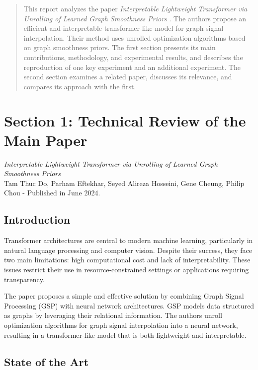 \documentclass{article}
\theoremstyle{plain}
\theoremstyle{definition}
\theoremstyle{remark}
\begin{document}
\begin{abstract}
This report analyzes the paper \textit{Interpretable Lightweight Transformer via Unrolling of Learned Graph Smoothness Priors} \cite{do2024interpretable}. The authors propose an efficient and interpretable transformer-like model for graph-signal interpolation. Their method uses unrolled optimization algorithms based on graph smoothness priors. The first section presents its main contributions, methodology, and experimental results, and describes the reproduction of one key experiment and an additional experiment. The second section examines a related paper, discusses its relevance, and compares its approach with the first.
\end{abstract}


\section*{Section 1: Technical Review of the Main Paper}

\textit{Interpretable Lightweight Transformer via Unrolling of Learned Graph Smoothness Priors}
\\Tam Thuc Do, Parham Eftekhar, Seyed Alireza Hosseini, Gene Cheung, Philip Chou - Published in June 2024.

\setcounter{section}{1}
\subsection{Introduction}

Transformer architectures are central to modern machine learning, particularly in natural language processing and computer vision. Despite their success, they face two main limitations: high computational cost and lack of interpretability. These issues restrict their use in resource-constrained settings or applications requiring transparency.

The paper proposes a simple and effective solution by combining Graph Signal Processing (GSP) with neural network architectures. GSP models data structured as graphs by leveraging their relational information. The authors unroll optimization algorithms for graph signal interpolation into a neural network, resulting in a transformer-like model that is both lightweight and interpretable.

\subsection{State of the Art}
\end{document}
